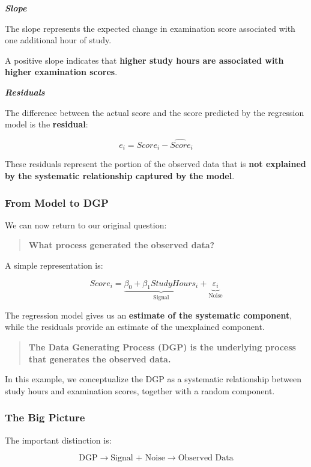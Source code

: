 \documentclass[
  a4paper,
]{article}
\begin{document}
\textbf{\emph{Slope}}

The slope represents the expected change in examination score associated
with one additional hour of study.

A positive slope indicates that \textbf{higher study hours are
associated with higher examination scores}.

\textbf{\emph{Residuals}}

The difference between the actual score and the score predicted by the
regression model is the \textbf{residual}:

\[
e_i = Score_i - \widehat{Score}_i
\]

These residuals represent the portion of the observed data that is
\textbf{not explained by the systematic relationship captured by the
model}.

\subsubsection{From Model to DGP}\label{from-model-to-dgp}

We can now return to our original question:

\begin{quote}
\textbf{What process generated the observed data?}
\end{quote}

A simple representation is:

\[
\boxed{
Score_i
=
\underbrace{\beta_0+\beta_1 StudyHours_i}_{\text{Signal}}
+
\underbrace{\varepsilon_i}_{\text{Noise}}
}
\]

The regression model gives us an \textbf{estimate of the systematic
component}, while the residuals provide an estimate of the unexplained
component.

\begin{quote}
\textbf{The Data Generating Process (DGP) is the underlying process that
generates the observed data.}
\end{quote}

In this example, we conceptualize the DGP as a systematic relationship
between study hours and examination scores, together with a random
component.

\subsubsection{The Big Picture}\label{the-big-picture}

The important distinction is:

\[
\boxed{
\text{DGP}
\rightarrow
\text{Signal + Noise}
\rightarrow
\text{Observed Data}
}
\]
\end{document}
